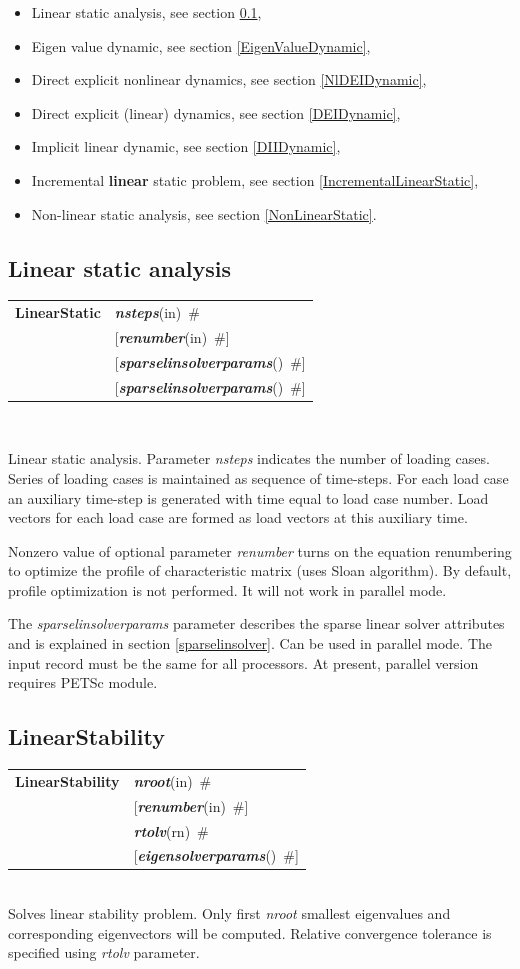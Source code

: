 \documentclass[a4paper]{article}
\makeatletter
\newcommand{\param}[1]{{\em #1}}
\newcommand{\keywordnotype}[1]{\mbox{{\it{\bf{#1}}}}}
\newcommand{\keyword}[2]{\mbox{{\keywordnotype{#1}\tiny (#2)}}}
\newcommand{\entKeywordInst}[1]{\mbox{{\bf{{#1}}}}}
\newcommand{\field}[2]{\mbox{\keyword{#1}{#2}~\#}}
\newcommand{\optField}[2]{\mbox{[\field{#1}{#2}]}}
\newcommand{\Pmode}[1]{{\sffamily #1}}
\newenvironment{record}[1][]{\begin{tabular}{|ll}}{\end{tabular}\\}
\newcommand{\recentry}[2]{{#1}&{#2}\\}
\newcounter{rcc}
\newenvironment{record}[1][\textwidth]{\setcounter{rcc}{0}\begin{tabular*}{#1}{|ll@{\extracolsep{\fill}}r}}{\end{tabular*}\\}
\newcommand{\recentry}[2]{\ifthenelse{\value{rcc}>0}{&$\backslash$ \\}{\setcounter{rcc}{1}}{#1}&{#2}}
\makeatother
\begin{document}
\begin{itemize}
\item Linear static analysis, see section \ref{LinearStatic},
\item Eigen value dynamic, see section \ref{EigenValueDynamic},
\item Direct explicit  nonlinear dynamics, see section
\ref{NlDEIDynamic},
\item Direct explicit (linear) dynamics, see section \ref{DEIDynamic},
\item Implicit linear dynamic, see section \ref{DIIDynamic},
\item Incremental {\bf linear} static problem, see section \ref{IncrementalLinearStatic},
\item Non-linear static analysis, see section \ref{NonLinearStatic}.
\end{itemize}

\subsection{Linear static analysis}
\label{LinearStatic}
\begin{record}
\recentry{\entKeywordInst{LinearStatic}}{\field{nsteps}{in}}
\recentry{}{\optField{renumber}{in}} 
\recentry{}{\optField{sparselinsolverparams}{}}
\recentry{}{\optField{sparselinsolverparams}{}}
\end{record}

Linear static analysis.
Parameter \param{nsteps} indicates the number of loading cases.
Series of loading cases is maintained as sequence of time-steps.
For each load case an auxiliary time-step is generated with time
equal to load case number.
Load vectors for each load case are formed as load vectors at
this auxiliary time.

Nonzero value of optional parameter \param{renumber} turns on the
equation renumbering to optimize the profile of characteristic matrix
(uses Sloan algorithm). By default, profile optimization is not
performed. It will not work in parallel mode.

The  \param{sparselinsolverparams} parameter describes the sparse
linear solver attributes and is explained in section \ref{sparselinsolver}.
\Pmode{Can be used in parallel mode. The input record must be the same
for all processors. At present, parallel version requires PETSc module.}


\subsection{LinearStability}
\label{LinearStability}
\begin{record}
\recentry{\entKeywordInst{LinearStability}}{\field{nroot}{in}}
\recentry{}{\optField{renumber}{in}}
\recentry{}{\field{rtolv}{rn}} \recentry{}{\optField{eigensolverparams}{}}
\end{record}
Solves linear stability problem. Only first \param{nroot} smallest
eigenvalues and corresponding eigenvectors will be computed. 
Relative convergence tolerance is specified using \param{rtolv} parameter.
\end{document}
